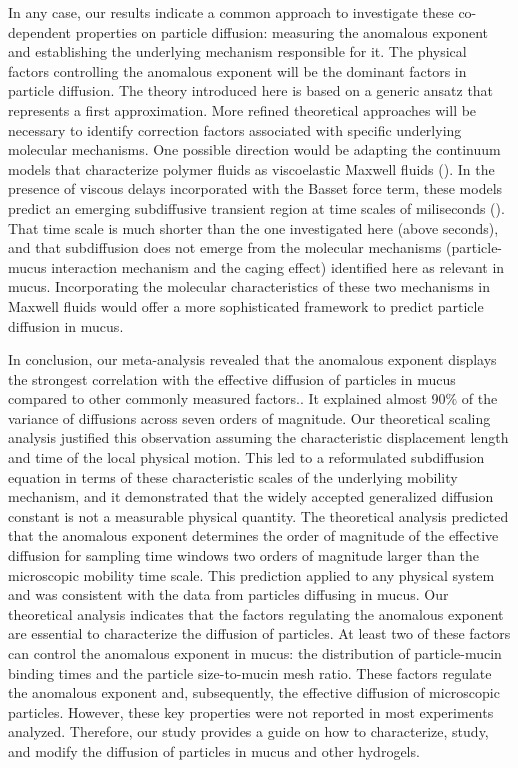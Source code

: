 \documentclass[aps,prl,preprint,superscriptaddress,showkeys,linenumbers]{revtex4-1}
\begin{document}
In any case, our results indicate a common approach to investigate these co-dependent properties on particle diffusion: measuring the anomalous exponent and establishing the underlying mechanism responsible for it. The physical factors controlling the anomalous exponent will be the dominant factors in particle diffusion. 
\textcolor{Antonio}{The theory introduced here is based on a generic ansatz that represents a first approximation. More refined theoretical approaches will be necessary to identify correction factors associated with specific underlying molecular mechanisms.
One possible direction would be adapting the continuum models that characterize polymer fluids as viscoelastic Maxwell fluids (\cite{Grebenkov2013PRE, Levine2000PRL,Grimm2011SoftMatter,SpagnSPRINGER2015}). In the presence of viscous delays incorporated with the Basset force term, these models predict an emerging subdiffusive transient region at time scales of miliseconds  (\cite{Grebenkov2013PRE}). That time scale is much shorter than the one investigated here (above seconds), and that subdiffusion does not emerge from the molecular mechanisms (particle-mucus interaction mechanism and the caging effect) identified here as relevant in mucus. Incorporating the molecular characteristics of these two mechanisms in Maxwell fluids would offer a more sophisticated framework to predict particle diffusion in mucus.}

In conclusion, our meta-analysis revealed that the anomalous exponent \textcolor{Antonio}{displays the strongest correlation with the effective diffusion of particles in mucus compared to other commonly measured factors.}. It explained almost 90$\%$ of the variance of diffusions across seven orders of magnitude. Our theoretical scaling analysis \textcolor{Antonio}{justified} this observation assuming the characteristic displacement length and time of the local physical motion. This led to a reformulated subdiffusion equation in terms of these characteristic scales of the underlying mobility mechanism, and it demonstrated that the widely accepted generalized diffusion constant is not a measurable physical quantity. The theoretical analysis predicted that the anomalous exponent determines the order of magnitude of the effective diffusion for sampling time windows two orders of magnitude larger than the microscopic mobility time scale. This prediction applied to any physical system and was consistent with the data from particles diffusing in mucus. Our theoretical analysis indicates that the factors regulating the anomalous exponent are essential to characterize the diffusion of particles. At least two of these factors can control the anomalous exponent in mucus: the distribution of particle-mucin binding times and the particle size-to-mucin mesh ratio. These factors regulate the anomalous exponent and, subsequently, the effective diffusion of microscopic particles. However, these key properties were not reported in most experiments analyzed. Therefore, our study provides a guide on how to characterize, study, and modify the diffusion of particles in mucus and other hydrogels.
\end{document}
